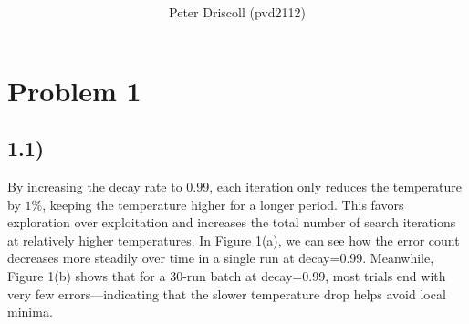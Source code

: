 \documentclass[11pt]{article}
\title{%
  \titlefont{COMS W4701: Artificial Intelligence, Spring 2025} \\
\subtitlefont{Homework \#2}} %
\author{Peter Driscoll (pvd2112)} %
\begin{document}
\maketitle

\section*{Problem 1}

\subsection*{1.1)}
By increasing the decay rate to 0.99, each iteration only reduces the temperature by $1\%$,
keeping the temperature higher for a longer period.
This favors exploration over exploitation and increases the total number of search iterations at relatively higher temperatures.
In Figure 1(a), we can see how the error count decreases more steadily over time in a single run at decay=0.99.
Meanwhile, Figure 1(b) shows that for a 30-run batch at decay=0.99,
most trials end with very few errors—indicating that the slower temperature drop helps avoid local minima.
\end{document}
